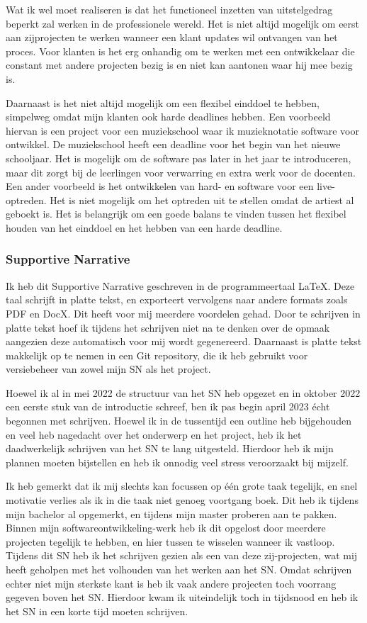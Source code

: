 Wat ik wel moet realiseren is dat het functioneel inzetten van uitstelgedrag beperkt zal werken in de professionele wereld. Het is niet altijd mogelijk om eerst aan zijprojecten te werken wanneer een klant updates wil ontvangen van het proces. Voor klanten is het erg onhandig om te werken met een ontwikkelaar die constant met andere projecten bezig is en niet kan aantonen waar hij mee bezig is.

Daarnaast is het niet altijd mogelijk om een flexibel einddoel te hebben, simpelweg omdat mijn klanten ook harde deadlines hebben. Een voorbeeld hiervan is een project voor een muziekschool waar ik muzieknotatie software voor ontwikkel. De muziekschool heeft een deadline voor het begin van het nieuwe schooljaar. Het is mogelijk om de software pas later in het jaar te introduceren, maar dit zorgt bij de leerlingen voor verwarring en extra werk voor de docenten. Een ander voorbeeld is het ontwikkelen van hard- en software voor een live-optreden. Het is niet mogelijk om het optreden uit te stellen omdat de artiest al geboekt is. Het is belangrijk om een goede balans te vinden tussen het flexibel houden van het einddoel en het hebben van een harde deadline.

\subsubsection*{Supportive Narrative}
Ik heb dit Supportive Narrative geschreven in de programmeertaal LaTeX. Deze taal schrijft in platte tekst, en exporteert vervolgens naar andere formats zoals PDF en DocX. Dit heeft voor mij meerdere voordelen gehad. Door te schrijven in platte tekst hoef ik tijdens het schrijven niet na te denken over de opmaak aangezien deze automatisch voor mij wordt gegenereerd. Daarnaast is platte tekst makkelijk op te nemen in een Git repository, die ik heb gebruikt voor versiebeheer van zowel mijn SN als het project.

Hoewel ik al in mei 2022 de structuur van het SN heb opgezet en in oktober 2022 een eerste stuk van de introductie schreef, ben ik pas begin april 2023 écht begonnen met schrijven. Hoewel ik in de tussentijd een outline heb bijgehouden en veel heb nagedacht over het onderwerp en het project, heb ik het daadwerkelijk schrijven van het SN te lang uitgesteld. Hierdoor heb ik mijn plannen moeten bijstellen en heb ik onnodig veel stress veroorzaakt bij mijzelf. 

Ik heb gemerkt dat ik mij slechts kan focussen op één grote taak tegelijk, en snel motivatie verlies als ik in die taak niet genoeg voortgang boek. Dit heb ik tijdens mijn bachelor al opgemerkt, en tijdens mijn master proberen aan te pakken. Binnen mijn softwareontwikkeling-werk heb ik dit opgelost door meerdere projecten tegelijk te hebben, en hier tussen te wisselen wanneer ik vastloop. Tijdens dit SN heb ik het schrijven gezien als een van deze zij-projecten, wat mij heeft geholpen met het volhouden van het werken aan het SN. Omdat schrijven echter niet mijn sterkste kant is heb ik vaak andere projecten toch voorrang gegeven boven het SN. Hierdoor kwam ik uiteindelijk toch in tijdsnood en heb ik het SN in een korte tijd moeten schrijven.

